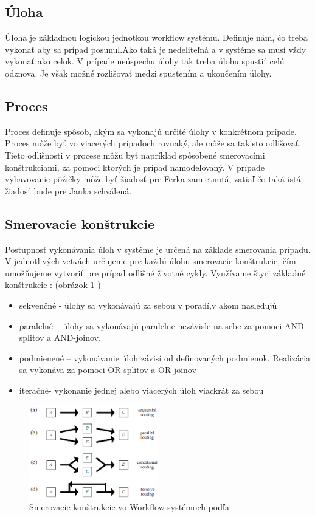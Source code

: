 \subsection{Úloha}
Úloha je základnou logickou jednotkou workflow systému. Definuje nám, čo treba vykonať aby sa prípad posunul.Ako taká je nedeliteľná a v systéme sa musí vždy vykonať ako celok. V prípade neúspechu úlohy tak treba úlohu spustiť celú odznova. Je však možné rozlišovať medzi spustením a ukončením úlohy. 

\subsection{Proces}
Proces definuje spôsob, akým sa vykonajú určité úlohy v konkrétnom prípade. Proces môže byť vo viacerých prípadoch rovnaký, ale môže sa takisto odlišovať. Tieto odlišnosti v procese môžu byť napríklad spôsobené smerovacími konštrukciami, za pomoci ktorých je prípad namodelovaný. V prípade vybavovanie pôžičky môže byť žiadosť pre Ferka zamietnutá, zatiaľ čo taká istá žiadosť bude pre Janka schválená.

\subsection{Smerovacie konštrukcie}
	Postupnosť vykonávania  úloh v systéme je určená na základe smerovania prípadu. V jednotlivých vetvách určujeme pre každú úlohu smerovacie konštrukcie, čím umožňujeme vytvoriť  pre prípad odlišné životné cykly. Využívame štyri základné konštrukcie :  (obrázok \ref{obr:smerovacie_konstrukcie_WfMS} )
\begin{itemize}
	\item sekvenčné - úlohy sa vykonávajú za sebou v poradí,v akom nasledujú
	\item paralelné – úlohy sa vykonávajú paralelne nezávisle na sebe za pomoci AND-splitov a AND-joinov.
	\item podmienené – vykonávanie úloh závisí od definovaných podmienok. Realizácia sa vykonáva za pomoci OR-splitov a OR-joinov
	\item iteračné- vykonanie jednej alebo viacerých úloh viackrát za sebou
\end{itemize}

\begin{figure}[H]
	\centerline{\includegraphics[width=0.5\textwidth]{images/smerovacie_konstrukcie}}
	\caption{Smerovacie konštrukcie vo Workflow systémoch podľa \cite{workflow_systemy}}
	\label{obr:smerovacie_konstrukcie_WfMS}
\end{figure}

